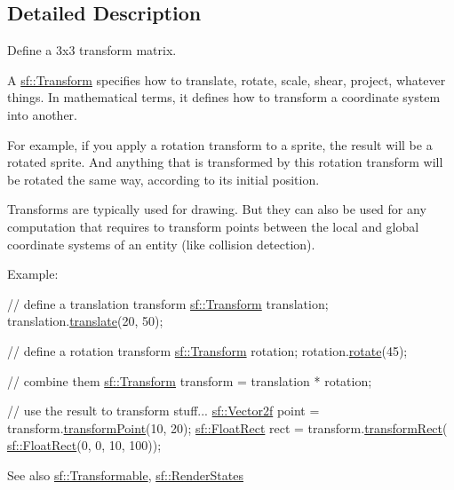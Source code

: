 \subsection{Detailed Description}
Define a 3x3 transform matrix. 

A \hyperlink{classsf_1_1_transform}{sf\+::\+Transform} specifies how to translate, rotate, scale, shear, project, whatever things. In mathematical terms, it defines how to transform a coordinate system into another.

For example, if you apply a rotation transform to a sprite, the result will be a rotated sprite. And anything that is transformed by this rotation transform will be rotated the same way, according to its initial position.

Transforms are typically used for drawing. But they can also be used for any computation that requires to transform points between the local and global coordinate systems of an entity (like collision detection).

Example\+: 
\begin{DoxyCode}
\textcolor{comment}{// define a translation transform}
\hyperlink{classsf_1_1_transform}{sf::Transform} translation;
translation.\hyperlink{classsf_1_1_transform_ab54f6c8070cc05e2afcb3145fbf4395a}{translate}(20, 50);

\textcolor{comment}{// define a rotation transform}
\hyperlink{classsf_1_1_transform}{sf::Transform} rotation;
rotation.\hyperlink{classsf_1_1_transform_a3e548c3c9e3fb9d4bd43cf852669e555}{rotate}(45);

\textcolor{comment}{// combine them}
\hyperlink{classsf_1_1_transform}{sf::Transform} transform = translation * rotation;

\textcolor{comment}{// use the result to transform stuff...}
\hyperlink{classsf_1_1_vector2}{sf::Vector2f} point = transform.\hyperlink{classsf_1_1_transform_af20913c6a27087c26192c116397ab40a}{transformPoint}(10, 20);
\hyperlink{classsf_1_1_rect}{sf::FloatRect} rect = transform.\hyperlink{classsf_1_1_transform_a345112559981d988e92b54b7976fca8a}{transformRect}(
      \hyperlink{classsf_1_1_rect}{sf::FloatRect}(0, 0, 10, 100));
\end{DoxyCode}


\begin{DoxySeeAlso}{See also}
\hyperlink{classsf_1_1_transformable}{sf\+::\+Transformable}, \hyperlink{classsf_1_1_render_states}{sf\+::\+Render\+States} 
\end{DoxySeeAlso}


